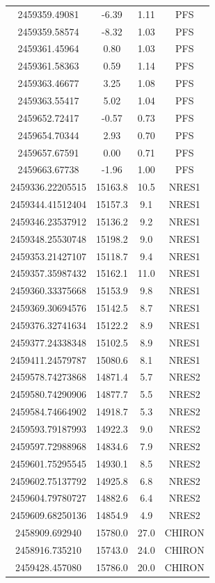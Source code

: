\documentclass[twocolumn]{aastex631}
\begin{document}
\begin{tabularx}{\linewidth}{cccc}
2459359.49081 & -6.39 & 1.11 & PFS \\
2459359.58574 & -8.32 & 1.03 & PFS \\
2459361.45964 & 0.80 & 1.03 & PFS \\
2459361.58363 & 0.59 & 1.14 & PFS \\
2459363.46677 & 3.25 & 1.08 & PFS \\
2459363.55417 & 5.02 & 1.04 & PFS \\
2459652.72417 & -0.57 & 0.73 & PFS \\
2459654.70344 & 2.93 & 0.70 & PFS \\
2459657.67591 & 0.00 & 0.71 & PFS \\
2459663.67738 & -1.96 & 1.00 & PFS \\
\hline
2459336.22205515 & 15163.8 & 10.5 & NRES1 \\
2459344.41512404 & 15157.3 & 9.1 & NRES1 \\
2459346.23537912 & 15136.2 & 9.2 & NRES1 \\
2459348.25530748 & 15198.2 & 9.0 & NRES1 \\
2459353.21427107 & 15118.7 & 9.4 & NRES1 \\
2459357.35987432 & 15162.1 & 11.0 & NRES1 \\
2459360.33375668 & 15153.9 & 9.8 & NRES1 \\
2459369.30694576 & 15142.5 & 8.7 & NRES1 \\
2459376.32741634 & 15122.2 & 8.9 & NRES1 \\
2459377.24338348 & 15102.5 & 8.9 & NRES1 \\
2459411.24579787 & 15080.6 & 8.1 & NRES1 \\
2459578.74273868 & 14871.4 & 5.7 & NRES2 \\
2459580.74290906 & 14877.7 & 5.5 & NRES2 \\
2459584.74664902 & 14918.7 & 5.3 & NRES2 \\
2459593.79187993 & 14922.3 & 9.0 & NRES2 \\
2459597.72988968 & 14834.6 & 7.9 & NRES2 \\
2459601.75295545 & 14930.1 & 8.5 & NRES2 \\
2459602.75137792 & 14925.8 & 6.8 & NRES2 \\
2459604.79780727 & 14882.6 & 6.4 & NRES2 \\
2459609.68250136 & 14854.9 & 4.9 & NRES2 \\
\hline
2458909.692940 & 15780.0 & 27.0 & CHIRON\\
2458916.735210 & 15743.0 & 24.0 & CHIRON\\
2459428.457080 & 15786.0 & 20.0 & CHIRON\\	
\end{tabularx}
\end{document}
